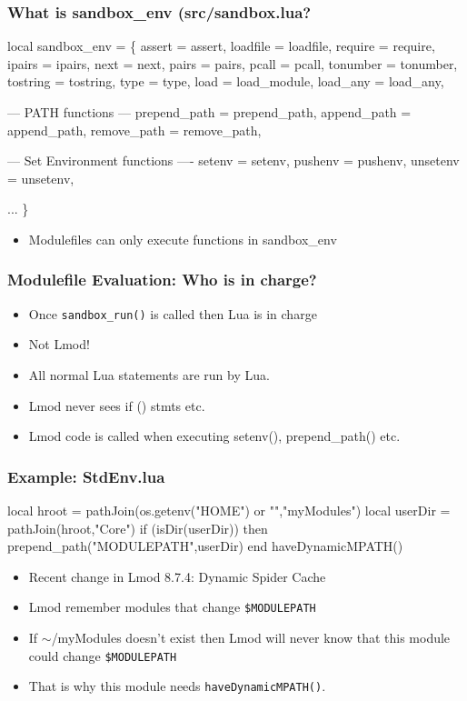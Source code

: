 \documentclass{beamer}
\begin{document}
\begin{frame}[fragile]
    \frametitle{What is sandbox\_env (src/sandbox.lua?}
 {\tiny
    \begin{semiverbatim}
local sandbox\_env = \{
  assert   = assert,
  loadfile = loadfile,
  require  = require,
  ipairs   = ipairs,
  next     = next,
  pairs    = pairs,
  pcall    = pcall,
  tonumber = tonumber,
  tostring = tostring,
  type     = type,
  load      = load\_module,
  load\_any = load\_any,

  --- PATH functions ---
  prepend\_path         = prepend\_path,
  append\_path          = append\_path,
  remove\_path          = remove\_path,

  --- Set Environment functions ----
  setenv               = setenv,
  pushenv              = pushenv,
  unsetenv             = unsetenv,

  ...
\}
    \end{semiverbatim}
}
  \begin{itemize}
    \item Modulefiles can only execute functions in sandbox\_env
  \end{itemize}
\end{frame}

\begin{frame}[fragile]
    \frametitle{Modulefile Evaluation:  Who is in charge?}
  \begin{itemize}
    \item Once \texttt{sandbox\_run()} is called then Lua is in charge
    \item Not Lmod!
    \item All normal Lua statements are run by Lua.
    \item Lmod never sees if () stmts etc.
    \item Lmod code is called when executing setenv(), prepend\_path() etc.
  \end{itemize}
\end{frame}

\begin{frame}[fragile]
    \frametitle{Example: StdEnv.lua}
 {\tiny
    \begin{semiverbatim}
local hroot   = pathJoin(os.getenv("HOME") or "","myModules")
local userDir = pathJoin(hroot,"Core")
if (isDir(userDir)) then
   prepend_path("MODULEPATH",userDir)
end
haveDynamicMPATH()
    \end{semiverbatim}
}
  \begin{itemize}
    \item Recent change in Lmod 8.7.4: Dynamic Spider Cache
    \item Lmod remember modules that change \texttt{\$MODULEPATH}
    \item If $\sim$/myModules doesn't exist then Lmod will never know
      that this module could change \texttt{\$MODULEPATH}
    \item That is why this module needs \texttt{haveDynamicMPATH()}.
  \end{itemize}

\end{frame}
\end{document}
